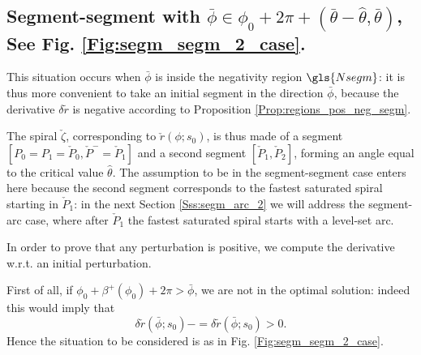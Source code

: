 \documentclass[reqno]{amsart}
\newcounter{assu}
\theoremstyle{definition} \newtheorem{definition}{Definition}[section]
\theoremstyle{definition} \newtheorem{remark}[definition]{Remark}
\theoremstyle{plain} \newtheorem{lemma}[definition]{Lemma}
\theoremstyle{plain} \newtheorem{proposition}[definition]{Proposition}
\theoremstyle{plain} \newtheorem{theorem}[definition]{Theorem}
\theoremstyle{plain} \newtheorem{corollary}[definition]{Corollary}
\theoremstyle{definition} \newtheorem{example}[definition]{Example}
\theoremstyle{plain} \newtheorem{claim}[clai]{Claim}
\theoremstyle{definition} \newtheorem{assumption}[definition]{Assumption}
\theoremstyle{definition} \newtheorem{observation}[definition]{Observation}
\newcommand{\1}{\mathbbm 1}
\numberwithin{equation}{section} %
\theoremstyle{plain} \newtheorem*{theorem*}{Theorem}
\theoremstyle{plain} \newtheorem{mthm}[maintheorem]{Main Theorem}
\theoremstyle{plain} \newtheorem*{mthm*}{Main Theorem}
\theoremstyle{plain} \newtheorem*{conjecture*}{Conjecture}
\theoremstyle{plain} \newtheorem{conjecture}[definition]{Conjecture}
\theoremstyle{plain} \newtheorem*{problem*}{Problem}
\begin{document}
\subsection{Segment-segment with \texorpdfstring{$\bar \phi \in \phi_0 + 2\pi + (\bar \theta-\hat \theta,\bar \theta)$}{bar phi in phi0 + 2pi + (bar theta - hat theta, bar theta)}, See Fig. \ref{Fig:segm_segm_2_case}.}
\label{Sss:segm_semg_neg}


This situation occurs when $\bar \phi$ is inside the negativity region $\gls{Nsegm}$: it is thus more convenient to take an initial segment in the direction $\bar \phi$, because the derivative $\delta \tilde r$ is negative according to Proposition \ref{Prop:regions_pos_neg_segm}.

The spiral $\check \zeta$, corresponding to $\check r(\phi;s_0)$, is thus made of a segment $[P_0 = P_1 = \check P_0, \check P^- = \check P_1]$ and a second segment $[\check P_1,\check P_2]$, forming an angle equal to the critical value $\hat \theta$. The assumption to be in the segment-segment case enters here because the second segment corresponds to the fastest saturated spiral starting in $\check P_1$: in the next Section \ref{Sss:segm_arc_2} we will address the segment-arc case, where after $\check P_1$ the fastest saturated spiral starts with a level-set arc.

In order to prove that any perturbation is positive, we compute the derivative w.r.t. an initial perturbation.

First of all, if $\phi_0 + \beta^+(\phi_0) + 2\pi > \bar \phi$, we are not in the optimal solution: indeed this would imply that
$$
\delta \check r(\bar \phi;s_0) -= \delta \tilde r(\bar \phi;s_0) > 0.
$$
Hence the situation to be considered is as in Fig. \ref{Fig:segm_segm_2_case}. %
\end{document}
